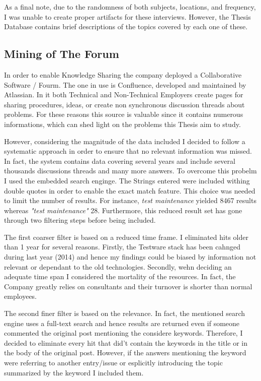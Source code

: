 As a final note, due to the randomness of both subjects, locations, and frequency, I was unable to create proper artifacts for these interviews. However, the Thesis Database contains brief descriptions of the topics covered by each one of these.

\subsection{Mining of The Forum}
In order to enable Knowledge Sharing the company deployed a Collaborative Software / Fourm. The one in use is Confluence, developed and maintained by Atlassian. In it both Technical and Non-Technical Employers create pages for sharing procedures, ideas, or create non synchronous discussion threads about problems. For these reasons this source is valuable since it contains numerous informations, which can shed light on the problems this Thesis aim to study.

However, considering the magnitude of the data included I decided to follow a systematic approach in order to ensure that no relevant information was missed. In fact, the system contains data covering several years and include several thousands discussions threads and many more answers. To overcome this probelm I used the embedded search enginge. The Strings entered were included withing double quotes in order to enable the exact match feature. This choice was needed to limit the number of results. For instance, \textit{test maintenance} yielded 8467 results whereas \textit{"test maintenance"} 28. Furthermore, this reduced result set has gone through two filtering steps before being included.

The first coarser filter is based on a reduced time frame. I eliminated hits older than 1 year for several reasons. Firstly, the Testware stack has been cahnged during last year (2014) and hence my findings could be biased by information not relevant or dependant to the old technologies. Secondly, wehn deciding an adequate time span I considered the mortality of the resources. In fact, the Company greatly relies on consultants and their turnover is shorter than normal employees.

The second finer filter is based on the relevance. In fact, the mentioned search engine uses a full-text search and hence results are returned even if someone commented the original post mentioning the considere keywords. Therefore, I decided to eliminate every hit that did't contain the keywords in the title or in the body of the original post. However, if the answers mentioning the keyword were referring to another entry/issue or esplicitly introducing the topic summarized by the keyword I included them.

